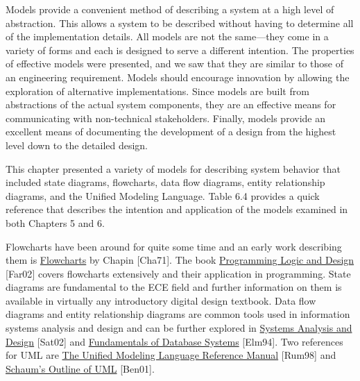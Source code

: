 Models provide a convenient method of describing a system at a high
level of abstraction. This allows a system to be described without
having to determine all of the implementation details. All models are
not the same---they come in a variety of forms and each is designed to
serve a different intention. The properties of effective models were
presented, and we saw that they are similar to those of an engineering
requirement. Models should encourage innovation by allowing the
exploration of alternative implementations. Since models are built from
abstractions of the actual system components, they are an effective
means for communicating with non-technical stakeholders. Finally, models
provide an excellent means of documenting the development of a design
from the highest level down to the detailed design.

This chapter presented a variety of models for describing system
behavior that included state diagrams, flowcharts, data flow diagrams,
entity relationship diagrams, and the Unified Modeling Language. Table
6.4 provides a quick reference that describes the intention and
application of the models examined in both Chapters 5 and 6.

Flowcharts have been around for quite some time and an early work
describing them is \ul{Flowcharts} by Chapin {[}Cha71{]}. The book
\ul{Programming Logic and Design} {[}Far02{]} covers flowcharts
extensively and their application in programming. State diagrams are
fundamental to the ECE field and further information on them is
available in virtually any introductory digital design textbook. Data
flow diagrams and entity relationship diagrams are common tools used in
information systems analysis and design and can be further explored in
\ul{Systems Analysis and Design} {[}Sat02{]} and \ul{Fundamentals of
Database Systems} {[}Elm94{]}. Two references for UML are \ul{The
Unified Modeling Language Reference Manual} {[}Rum98{]} and \ul{Schaum's
Outline of UML} {[}Ben01{]}.
